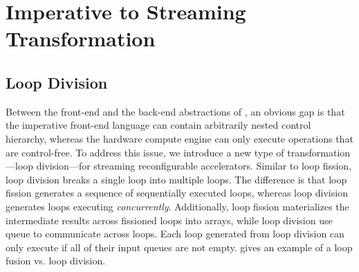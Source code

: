 \section{Imperative to Streaming Transformation}
\label{sec:control}



\subsection{Loop Division}\label{sec:loopdiv}
Between the front-end and the back-end abstractions of \name, an obvious gap is that 
the imperative front-end language can contain arbitrarily nested control hierarchy, whereas
the hardware compute engine can only execute operations that are control-free.
To address this issue, we introduce a new type of transformation---loop division---for streaming reconfigurable
accelerators.
Similar to loop fission, loop division breaks a single loop into multiple loops.
The difference is that loop fission generates a sequence of sequentially executed loops, whereas
loop division generates loops executing \emph{concurrently}.
Additionally, loop fission materializes the intermediate results across fissioned loops into arrays,
while loop division use queue to communicate across loops.
Each loop generated from loop division can only execute if all of their input queues are not empty.
 gives an example of a loop fusion vs. loop division.

